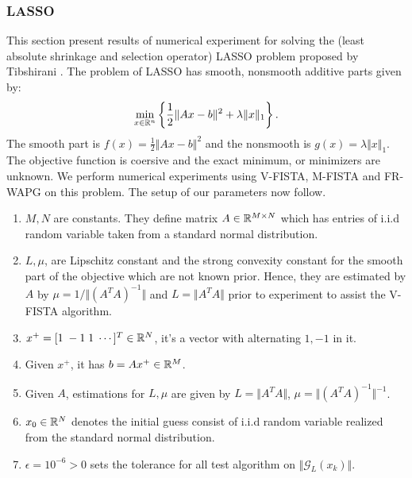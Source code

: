 \documentclass[12pt]{article}
\begin{document}
        \subsubsection{LASSO}
            This section present results of numerical experiment for solving the (least absolute shrinkage and selection operator) LASSO problem proposed by Tibshirani \cite{tibshirani_regression_1996}. 
            The problem of LASSO has smooth, nonsmooth additive parts given by: 
            \begin{align*}
                \min_{x \in \mathbb R^n}
                \left\lbrace
                    \frac{1}{2}\Vert Ax - b\Vert^2 + \lambda\Vert x\Vert_1
                \right\rbrace. 
            \end{align*}
            The smooth part is $f(x) =\frac{1}{2}\Vert Ax - b\Vert^2$ and the nonsmooth is $g(x) = \lambda\Vert x\Vert_1$. 
            The objective function is coersive and the exact minimum, or minimizers are unknown. 
            We perform numerical experiments using V-FISTA, M-FISTA and FR-WAPG on this problem. 
            The setup of our parameters now follow. 
            \begin{enumerate}
                \item $M, N$ are constants. They define matrix $A \in \mathbb R^{M\times N}$ which has entries of i.i.d random variable taken from a standard normal distribution. 
                \item $L, \mu$, are Lipschitz constant and the strong convexity constant for the smooth part of the objective which are not known prior. Hence, they are estimated by $A$ by $\mu = 1/\Vert (A^TA)^{-1}\Vert$ and $L = \Vert A^TA\Vert$ prior to experiment to assist the V-FISTA algorithm. 
                \item $x^+ = [1\; -1\; 1 \; \cdots ]^T \in \mathbb R^N$, it's a vector with alternating $1, -1$ in it. 
                \item Given $x^+$, it has $b = Ax^+ \in \mathbb R^M$. 
                \item Given $A$, estimations for $L,\mu$ are given by $L = \Vert A^TA\Vert$, $\mu = \Vert (A^TA)^{-1}\Vert^{-1}$. 
                \item $x_0\in \mathbb R^N$ denotes the initial guess consist of i.i.d random variable realized from the standard normal distribution. 
                \item $\epsilon = 10^{-6} > 0$ sets the tolerance for all test algorithm on $\Vert \mathcal G_L(x_k)\Vert$. 
            \end{enumerate}
\end{document}
